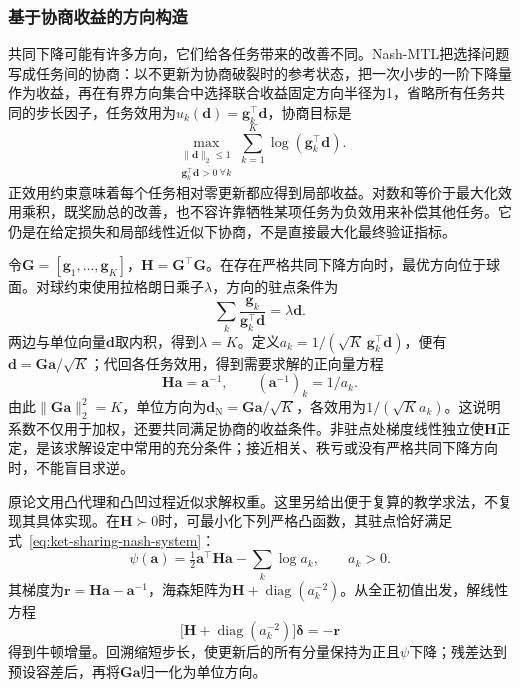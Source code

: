 \subsubsection{基于协商收益的方向构造}
\label{sec:ket-sharing-nash}

共同下降可能有许多方向，它们给各任务带来的改善不同。Nash-MTL把选择问题写成任务间的协商：以不更新为协商破裂时的参考状态，把一次小步的一阶下降量作为收益，再在有界方向集合中选择联合收益固定方向半径为1，省略所有任务共同的步长因子，任务效用为$u_k(\bm d)=\bm g_k^{\top}\bm d$，协商目标是
\begin{equation}
  \max_{\substack{\|\bm d\|_2\leq1\\
                  \bm g_k^{\top}\bm d>0\ \forall k}}
  \sum_{k=1}^{K}\log(\bm g_k^{\top}\bm d).
  \label{eq:ket-sharing-nash-objective}
\end{equation}
正效用约束意味着每个任务相对零更新都应得到局部收益。对数和等价于最大化效用乘积，既奖励总的改善，也不容许靠牺牲某项任务为负效用来补偿其他任务。它仍是在给定损失和局部线性近似下协商，不是直接最大化最终验证指标。

令$\bm G=[\bm g_1,\ldots,\bm g_K]$，$\bm H=\bm G^{\top}\bm G$。在存在严格共同下降方向时，最优方向位于球面。对球约束使用拉格朗日乘子$\lambda$，方向的驻点条件为
\begin{equation}
  \sum_k\frac{\bm g_k}{\bm g_k^{\top}\bm d}
  =\lambda\bm d.
\end{equation}
两边与单位向量$\bm d$取内积，得到$\lambda=K$。定义$a_k=1/(\sqrt K\,\bm g_k^{\top}\bm d)$，便有$\bm d=\bm G\bm a/\sqrt K$；代回各任务效用，得到需要求解的正向量方程
\begin{equation}
  \bm H\bm a=\bm a^{-1},
  \qquad
  (\bm a^{-1})_k=1/a_k.
  \label{eq:ket-sharing-nash-system}
\end{equation}
由此$\|\bm G\bm a\|_2^2=K$，单位方向为$\bm d_{\mathrm N}=\bm G\bm a/\sqrt K$，各效用为$1/(\sqrt K a_k)$。这说明系数不仅用于加权，还要共同满足协商的收益条件。非驻点处梯度线性独立使$\bm H$正定，是该求解设定中常用的充分条件；接近相关、秩亏或没有严格共同下降方向时，不能盲目求逆。

原论文用凸代理和凸凹过程近似求解权重。这里另给出便于复算的教学求法，不复现其具体实现。在$\bm H\succ0$时，可最小化下列严格凸函数，其驻点恰好满足式~\eqref{eq:ket-sharing-nash-system}：
\begin{equation}
  \psi(\bm a)
  =\tfrac12\bm a^{\top}\bm H\bm a
   -\sum_k\log a_k,
  \qquad a_k>0.
  \label{eq:ket-sharing-nash-newton}
\end{equation}
其梯度为$\bm r=\bm H\bm a-\bm a^{-1}$，海森矩阵为$\bm H+\operatorname{diag}(a_k^{-2})$。从全正初值出发，解线性方程
\[
  \bigl[\bm H+\operatorname{diag}(a_k^{-2})\bigr]
  \bm\delta=-\bm r
\]
得到牛顿增量。回溯缩短步长，使更新后的所有分量保持为正且$\psi$下降；残差达到预设容差后，再将$\bm G\bm a$归一化为单位方向。

